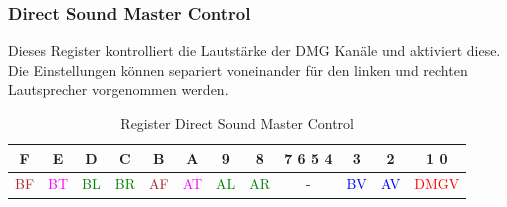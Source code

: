 \documentclass[11pt,a4paper]{scrartcl}
\begin{document}
\newpage


\subsubsection{Direct Sound Master Control}

	Dieses Register kontrolliert die Lautst\"arke der DMG Kan\"ale und aktiviert diese. Die Einstellungen k\"onnen separiert voneinander f\"ur den linken und rechten Lautsprecher vorgenommen werden. 

	\begin{table}[h]
	\centering
	\begin{tabular}{| c | c | c | c | c | c | c | c | c | c | c | c |}
	\hline
	F & E & D & C & B & A & 9 & 8 & 7 6 5 4 & 3 & 2 & 1 0 \\
	\hline
	\textcolor{brown}{BF} & \textcolor{magenta}{BT} & \textcolor{green}{BL} & \textcolor{green}{BR} & \textcolor{brown}{AF} & \textcolor{magenta}{AT}
	& \textcolor{green}{AL} & \textcolor{green}{AR} & - & \textcolor{blue}{BV} & \textcolor{blue}{AV} & \textcolor{red}{DMGV} \\
	\hline
	
	\end{tabular}
	\caption{Register Direct Sound Master Control}
	\label{table: DirectSoundMasterControl}
	\end{table}
	
\end{document}
